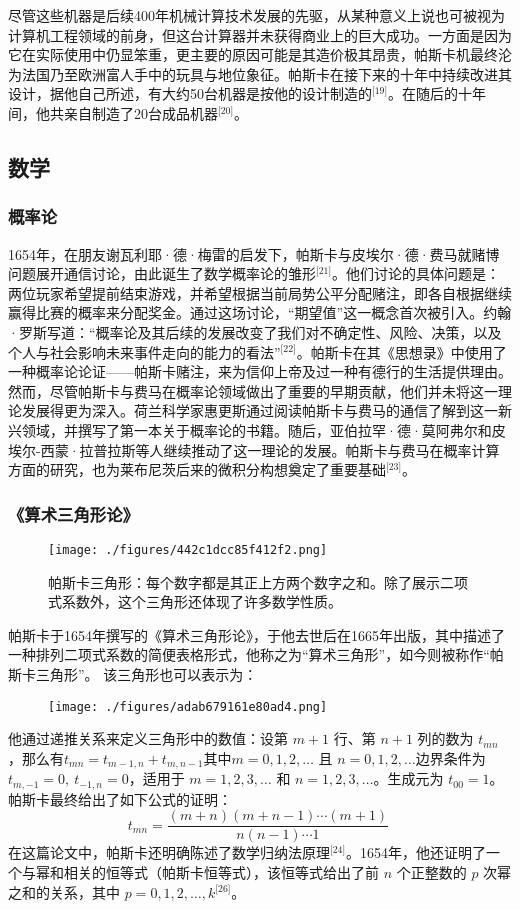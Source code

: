 尽管这些机器是后续400年机械计算技术发展的先驱，从某种意义上说也可被视为计算机工程领域的前身，但这台计算器并未获得商业上的巨大成功。一方面是因为它在实际使用中仍显笨重，更主要的原因可能是其造价极其昂贵，帕斯卡机最终沦为法国乃至欧洲富人手中的玩具与地位象征。帕斯卡在接下来的十年中持续改进其设计，据他自己所述，有大约50台机器是按他的设计制造的\(^\text{[19]}\)。在随后的十年间，他共亲自制造了20台成品机器\(^\text{[20]}\)。
\subsection{数学}
\subsubsection{概率论}
1654年，在朋友谢瓦利耶·德·梅雷的启发下，帕斯卡与皮埃尔·德·费马就赌博问题展开通信讨论，由此诞生了数学概率论的雏形\(^\text{[21]}\)。他们讨论的具体问题是：两位玩家希望提前结束游戏，并希望根据当前局势公平分配赌注，即各自根据继续赢得比赛的概率来分配奖金。通过这场讨论，“期望值”这一概念首次被引入。约翰·罗斯写道：“概率论及其后续的发展改变了我们对不确定性、风险、决策，以及个人与社会影响未来事件走向的能力的看法”\(^\text{[22]}\)。帕斯卡在其《思想录》中使用了一种概率论论证——帕斯卡赌注，来为信仰上帝及过一种有德行的生活提供理由。然而，尽管帕斯卡与费马在概率论领域做出了重要的早期贡献，他们并未将这一理论发展得更为深入。荷兰科学家惠更斯通过阅读帕斯卡与费马的通信了解到这一新兴领域，并撰写了第一本关于概率论的书籍。随后，亚伯拉罕·德·莫阿弗尔和皮埃尔-西蒙·拉普拉斯等人继续推动了这一理论的发展。帕斯卡与费马在概率计算方面的研究，也为莱布尼茨后来的微积分构想奠定了重要基础\(^\text{[23]}\)。
\subsubsection{《算术三角形论》}
\begin{figure}[ht]
\centering
\texttt{[image: ./figures/442c1dcc85f412f2.png]}
\caption{帕斯卡三角形：每个数字都是其正上方两个数字之和。除了展示二项式系数外，这个三角形还体现了许多数学性质。} \label{fig_BLSpsk_3}
\end{figure}
帕斯卡于1654年撰写的《算术三角形论》，于他去世后在1665年出版，其中描述了一种排列二项式系数的简便表格形式，他称之为“算术三角形”，如今则被称作“帕斯卡三角形”。
该三角形也可以表示为：
\begin{figure}[ht]
\centering
\texttt{[image: ./figures/adab679161e80ad4.png]}
\caption{} \label{fig_BLSpsk_4}
\end{figure}
他通过递推关系来定义三角形中的数值：设第 $m+1$ 行、第 $n+1$ 列的数为 $t_{mn}$，那么有$t_{mn} = t_{m-1,n} + t_{m,n-1}$其中$m = 0, 1, 2, \ldots \text{ 且 } n = 0, 1, 2, \ldots$边界条件为 $t_{m,-1} = 0, \ t_{-1,n} = 0$，适用于 $m = 1, 2, 3, \ldots$ 和 $n = 1, 2, 3, \ldots$。生成元为 $t_{00} = 1$。帕斯卡最终给出了如下公式的证明：
$$
t_{mn} = \frac{(m+n)(m+n-1)\cdots(m+1)}{n(n-1)\cdots1}~
$$
在这篇论文中，帕斯卡还明确陈述了数学归纳法原理\(^\text{[24]}\)。1654年，他还证明了一个与幂和相关的恒等式（帕斯卡恒等式），该恒等式给出了前 $n$ 个正整数的 $p$ 次幂之和的关系，其中 $p = 0, 1, 2, \ldots, k$\(^\text{[26]}\)。

